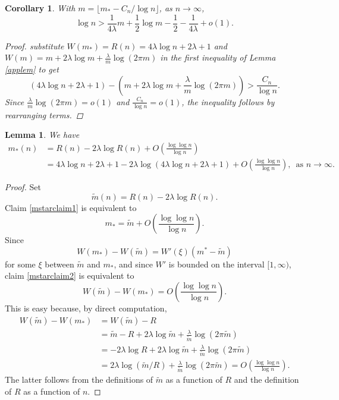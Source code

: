 \documentclass[reqno]{amsart}
\theoremstyle{theorem}
\newtheorem{lemma}[theorem]{Lemma}
\newtheorem{corollary}[theorem]{Corollary}
\theoremstyle{definition}
\theoremstyle{remark}
\newcommand{\1}{{\text{\Large $\mathfrak 1$}}}	%
\numberwithin{equation}{section}
\begin{document}
\begin{corollary}
\label{coroA3}
With $m=\lfloor m_* - C_n/\log n \rfloor$, as $n \to \infty$,
\[
\log n > \frac{1}{4 \lambda} m + \frac{1}{2} \log m - \frac{1}{2} -\frac{1}{4 \lambda}
+ o(1).
\]
\begin{proof}
substitute $W(m_*) = R(n) = 4 \lambda \log n + 2\lambda +1$
and $W(m) = m+ 2\lambda \log m + \frac{\lambda}{m} \log(2\pi m)$ in the first
inequality of Lemma \ref{applem} to get
\[
(4 \lambda \log n +2\lambda + 1) 
-\left(m+ 2\lambda \log m + \frac{\lambda}{m} \log(2\pi m)\right) 
> \frac{C_n}{\log n}.
\]
Since $\frac{\lambda}{m} \log(2\pi m)=o(1)$ and $\frac{C_n}{\log n}=o(1)$,
the inequality follows by rearranging terms.
\end{proof}
\end{corollary}


\begin{lemma}
\label{mstarapprox}
We have
\begin{equation}
\label{mstarclaim1}
\begin{split}
m_*(n) &= R(n) - 2\lambda \log R(n) + O\left(\frac{\log\log n}{\log n}\right)
\\
&=  4\lambda \log n+2\lambda+1
-2\lambda \log(4\lambda \log n+2\lambda+1) 
+ O\left(\frac{\log\log n}{\log n}\right),\, \text{ as $n \to \infty$.}
\end{split}
\end{equation}
\end{lemma}

\begin{proof}
Set 
\[
\tilde m(n) = R(n) - 2\lambda \log R(n).
\]
Claim \eqref{mstarclaim1} is equivalent to 
\begin{equation}
\label{mstarclaim2}
m_* = \tilde m + O\left(\frac{\log\log n}{\log n}\right).
\end{equation}
Since
\[
W(m_*) - W(\tilde m) = W'(\xi) (m^*-\tilde m)
\]
for some $\xi$ between $\tilde m$ and $m_*$,
and since $W'$ is bounded on the interval $[1,\infty)$,
claim \eqref{mstarclaim2}
is equivalent to
\begin{equation}
\label{mstarclaim3}
W(\tilde m)-W(m_*)  = O\left(\frac{\log\log n}{\log n}\right).
\end{equation}
This is easy because, by direct computation,
\begin{align*}
W(\tilde m)- W(m_*) &= W(\tilde m) - R
\\
&= \tilde m -R  + 2\lambda \log \tilde m  
+ \frac{\lambda}{\tilde m } \log(2\pi \tilde m )
\\
&= -2\lambda \log R + 2\lambda \log \tilde m 
+ \frac{\lambda}{\tilde m } \log(2\pi \tilde m )
\\
&= 2\lambda \log(\tilde m/R) + \frac{\lambda}{\tilde m } \log(2\pi \tilde m )
= O\left(\frac{\log\log n}{\log n}\right).
\end{align*}
The latter follows from the definitions of $\tilde m$ as a function of $R$
and the definition of $R$ as a function of $n$.
\end{proof}
\end{document}

